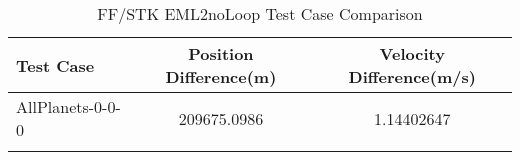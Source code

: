 \begin{table}[htbp!]
\centering
\caption{ FF/STK EML2noLoop Test Case Comparison}
      \begin{tabular}{lcc}
      \hline\hline
          Test Case & Position Difference(m) & Velocity Difference(m/s) \\
         \hline
         AllPlanets-0-0-0 & 209675.0986 & 1.14402647 \\
      \hline\hline
      \label{Table: EML2noLoop FF-STK Table} 
\end{tabular}
\end{table}
